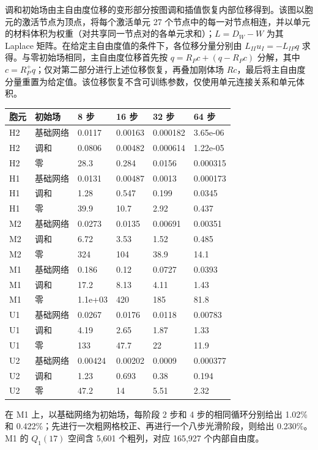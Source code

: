 \documentclass[preprint,12pt,authoryear]{elsarticle}
\begin{document}
调和初始场由主自由度位移的变形部分按图调和插值恢复内部位移得到。该图以胞元的激活节点为顶点，将每个激活单元 27 个节点中的每一对节点相连，并以单元的材料体积为权重（对共享同一节点对的各单元求和）；\(L=D_W-W\) 为其 Laplace 矩阵。在给定主自由度值的条件下，各位移分量分别由 \(L_{II}u_I=-L_{IP}q\) 求得。与零初始场相同，主自由度位移首先按 \(q=R_Pc+(q-R_Pc)\) 分解，其中 \(c=R_P^{+}q\)；仅对第二部分进行上述位移恢复，再叠加刚体场 \(Rc\)，最后将主自由度分量重置为给定值。该位移恢复不含可训练参数，仅使用单元连接关系和单元体积。

{\small
\begin{longtable}[]{@{}llllll@{}}
\toprule\noalign{}
胞元 & 初始场 & 8 步 & 16 步 & 32 步 & 64 步 \\
\midrule\noalign{}
\endhead
\bottomrule\noalign{}
\endlastfoot
H2 & 基础网络 & 0.0117 & 0.00163 & 0.000182 & 3.65e-06 \\
H2 & 调和 & 0.0806 & 0.00482 & 0.000614 & 1.22e-05 \\
H2 & 零 & 28.3 & 0.284 & 0.0156 & 0.000315 \\
H1 & 基础网络 & 0.0131 & 0.00487 & 0.0013 & 0.000173 \\
H1 & 调和 & 1.28 & 0.547 & 0.199 & 0.0345 \\
H1 & 零 & 39.9 & 10.7 & 2.92 & 0.437 \\
M2 & 基础网络 & 0.0273 & 0.0135 & 0.00691 & 0.00351 \\
M2 & 调和 & 6.72 & 3.53 & 1.52 & 0.485 \\
M2 & 零 & 324 & 104 & 38.9 & 14.1 \\
M1 & 基础网络 & 0.186 & 0.12 & 0.0727 & 0.0393 \\
M1 & 调和 & 17.2 & 8.13 & 4.11 & 1.43 \\
M1 & 零 & 1.1e+03 & 420 & 185 & 81.8 \\
U1 & 基础网络 & 0.0267 & 0.0176 & 0.0118 & 0.00783 \\
U1 & 调和 & 4.19 & 2.65 & 1.87 & 1.33 \\
U1 & 零 & 133 & 47.7 & 22 & 11.9 \\
U2 & 基础网络 & 0.00424 & 0.00202 & 0.0009 & 0.000377 \\
U2 & 调和 & 1.23 & 0.693 & 0.38 & 0.194 \\
U2 & 零 & 47.2 & 14 & 5.51 & 2.32 \\
\end{longtable}}

在 M1 上，以基础网络为初始场，每阶段 2 步和 4 步的相同循环分别给出 1.02\% 和 0.422\%；先进行一次粗网格校正、再进行一个八步光滑阶段，则给出 0.230\%。M1 的 \(Q_1(17)\) 空间含 5,601 个粗列，对应 165,927 个内部自由度。
\end{document}
